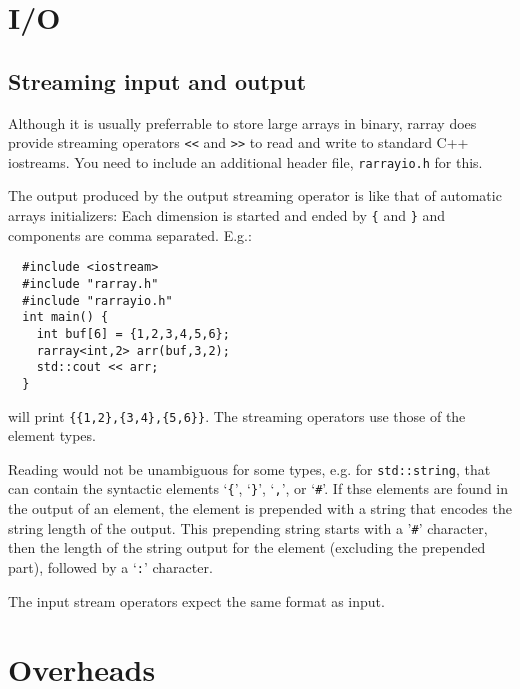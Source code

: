 \documentclass[11pt,twoside]{article}
\begin{document}
\section{I/O}

\subsection{Streaming input and output}

Although it is usually preferrable to store large arrays in binary, rarray does provide streaming operators \texttt{<<} and \texttt{>>} to read and write to standard C++ iostreams.  You need to include an additional header file, \texttt{rarrayio.h} for this.

The output produced by the output streaming operator is like that of automatic arrays initializers: Each dimension is started and ended by \texttt{\{} and \texttt{\}} and components are comma separated. 
E.g.:\vspace{-9pt}
\begin{framed}\vspace{-18pt}%
\begin{verbatim}
  #include <iostream>
  #include "rarray.h"
  #include "rarrayio.h"
  int main() {
    int buf[6] = {1,2,3,4,5,6};
    rarray<int,2> arr(buf,3,2);
    std::cout << arr;
  }
\end{verbatim}%
\vspace{-12pt}
\end{framed}\vspace{-8pt}\noindent
will print \texttt{\{\{1,2\},\{3,4\},\{5,6\}\}}. The streaming operators use those of the element types. 

Reading would not be unambiguous for some types, e.g. for \texttt{std::string}, that can contain the syntactic elements `\texttt{\{}', `\texttt{\}}', `\texttt{,}', or `\texttt{\#}'.  If thse elements are found in the output of an element, the element is prepended with a string that encodes the string length of the output. This prepending string starts with a '\texttt\#' character, then the length of the string output for the element  (excluding the prepended part), followed by a `\texttt:' character.

The input stream operators expect the same format as input.

\section{Overheads}
\end{document}
